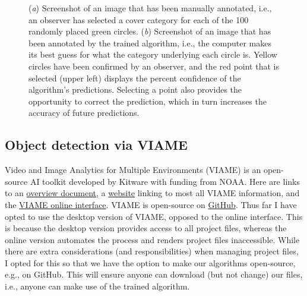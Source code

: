 \documentclass[11pt]{article}
\begin{document}
\begin{figure}[h!]
\centering
{}
\caption{
(\textit{a}) Screenshot of an image that has been manually annotated, 
i.e., an observer has selected a cover category for each of the 100 
randomly placed green circles. 
(\textit{b}) Screenshot of an image that has been annotated by the 
trained algorithm, i.e., the computer makes its best guess for what the 
category underlying each circle is. 
Yellow circles have been confirmed by an observer, and the red point 
that is selected (upper left) displays the percent confidence of the 
algorithm's predictions.
Selecting a point also provides the opportunity to correct the 
prediction, which in turn increases the accuracy of future 
predictions.  
}
\label{CoralNet}
\end{figure}

\subsection{Object detection via VIAME}
Video and Image Analytics for Multiple Environments (VIAME) is an 
open-source AI toolkit developed by Kitware with funding from NOAA. 
Here are links to an 
\href{https://www.viametoolkit.org/wp-content/uploads/2020/09/VIAME-AI-Workshop-Aug2020.pdf}{overview
 document}, a 
\href{https://viame.readthedocs.io/en/latest/index.html}{website} 
linking to most all VIAME information, and the 
\href{https://viame.kitware.com/#/}{VIAME online interface}. 
VIAME is open-source on 
\href{https://github.com/viame/VIAME}{GitHub}. 
Thus far I have opted to use the desktop version of VIAME, opposed 
to the online interface. 
This is because the desktop version provides access to all project 
files, whereas the online version automates the process and renders 
project files inaccessible. 
While there are extra considerations (and responsibilities) when 
managing project files, I opted for this so that we have the option to 
make our algorithms open-source, e.g., on GitHub.  
This will ensure anyone can download (but not change) our files, i.e., 
anyone can make use of the trained algorithm.
\end{document}
